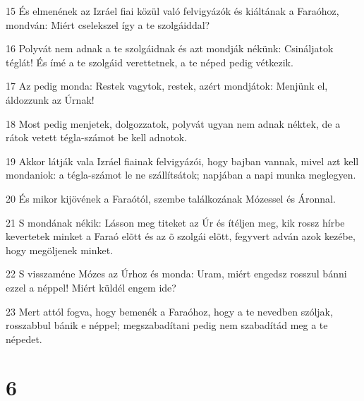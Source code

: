 \par 15 És elmenének az Izráel fiai közül való felvigyázók és kiáltának a Faraóhoz, mondván: Miért cselekszel így a te szolgáiddal?
\par 16 Polyvát nem adnak a te szolgáidnak és azt mondják nékünk: Csináljatok téglát! És ímé a te szolgáid verettetnek, a te néped pedig vétkezik.
\par 17 Az pedig monda: Restek vagytok, restek, azért mondjátok: Menjünk el, áldozzunk az Úrnak!
\par 18 Most pedig menjetek, dolgozzatok, polyvát ugyan nem adnak néktek, de a rátok vetett tégla-számot be kell adnotok.
\par 19 Akkor látják vala Izráel fiainak felvigyázói, hogy bajban vannak, mivel azt kell mondaniok: a tégla-számot le ne szállítsátok; napjában a napi munka meglegyen.
\par 20 És mikor kijövének a Faraótól, szembe találkozának Mózessel és Áronnal.
\par 21 S mondának nékik: Lásson meg titeket az Úr és ítéljen meg, kik rossz hírbe kevertetek minket a Faraó elõtt és az õ szolgái elõtt, fegyvert adván azok kezébe, hogy megöljenek minket.
\par 22 S visszaméne Mózes az Úrhoz és monda: Uram, miért engedsz rosszul bánni ezzel a néppel! Miért küldél engem ide?
\par 23 Mert attól fogva, hogy bemenék a Faraóhoz, hogy a te nevedben szóljak, rosszabbul bánik e néppel; megszabadítani pedig nem szabadítád meg a te népedet.

\chapter{6}


